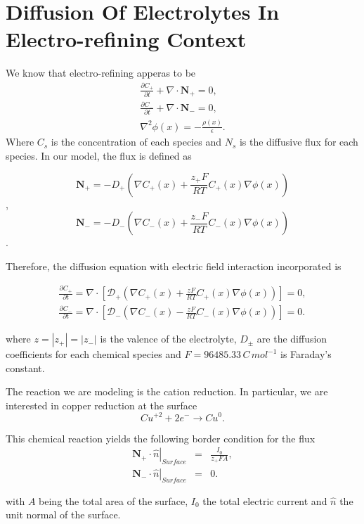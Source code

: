 \section{Diffusion Of Electrolytes In Electro-refining Context}

We know that electro-refining  apperas to be
\begin{eqnarray}
\frac{\partial C_+}{\partial t}+\nabla\cdot \mathbf{N}_+ = 0, \\
\frac{\partial C_-}{\partial t}+\nabla\cdot \mathbf{N}_- = 0, \\
\nabla^2\phi(x)=-\frac{\rho(x)}{\epsilon}.
\end{eqnarray}
Where $C_s$ is the concentration of each species and $N_s$ is the diffusive flux for each species.
In our model, the flux is defined as

$$\mathbf{N}_+= -D_+\left(\nabla C_+(x) +\frac{z_+ F}{RT}C_+(x)\nabla\phi(x)\right)$$,
$$\mathbf{N}_-= -D_-\left(\nabla C_-(x) +\frac{z_- F}{RT}C_-(x)\nabla\phi(x)\right)$$.

Therefore, the diffusion equation with electric field interaction incorporated is \cite{Dolde2011}

\begin{eqnarray}
\frac{\partial C_+}{\partial t}=\nabla\cdot\left[ \mathcal{D}_+\left(\nabla C_+(x) +\frac{z F}{RT}C_+(x)\nabla\phi(x)\right)\right]= 0, \\
\frac{\partial C_-}{\partial t}=\nabla\cdot\left[ \mathcal{D}_-\left(\nabla C_-(x) -\frac{z F}{RT}C_-(x)\nabla\phi(x)\right)\right] = 0.
\end{eqnarray}

where $z = |z_+|=|z_-|$ is the valence of the electrolyte, $D_{\pm}$ are the diffusion coefficients for each chemical species and $F = 96485.33\,C\,mol^{-1}$ is Faraday's constant.

The reaction we are modeling is the cation reduction. In particular, we are interested in copper reduction at the surface
\begin{equation}
Cu^{+2} + 2 e^{-} \rightarrow Cu^{0}.
\end{equation}

This chemical reaction yields the following border condition for the flux
\begin{eqnarray}
\left.\mathbf{N}_{+}\cdot\hat{n}\right|_{Surface} &=& \frac{I_{0}}{z_{+}FA},\nonumber\\
\left.\mathbf{N}_{-}\cdot\hat{n}\right|_{Surface} &=& 0.
\label{eq_bc1}
\end{eqnarray}

with $A$ being the total area of the surface, $I_{0}$ the total electric current and $\hat{n}$ the unit normal of the surface.